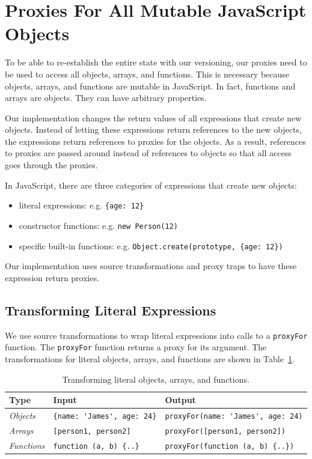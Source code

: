\section{Proxies For All Mutable JavaScript Objects}

To be able to re-establish the entire state with our versioning, our proxies need to be used to access all objects, arrays, and functions.
This is necessary because objects, arrays, and functions are mutable in JavaScript.
In fact, functions and arrays are objects.
They can have arbitrary properties.

Our implementation changes the return values of all expressions that create new objects.
Instead of letting these expressions return references to the new objects, the expressions return references to proxies for the objects.
As a result, references to proxies are passed around instead of references to objects so that all access goes through the proxies.

In JavaScript, there are three categories of expressions that create new objects: 
\begin{itemize}
    \item literal expressions: e.g. \lstinline|{age: 12}|
    \item constructor functions: e.g. \lstinline|new Person(12)|
    \item specific built-in functions: e.g. \lstinline|Object.create(prototype, {age: 12})|
\end{itemize}

Our implementation uses source transformations and proxy traps to have these expression return proxies.


\subsection{Transforming Literal Expressions}

We use source transformations to wrap literal expressions into calls to a \lstinline{proxyFor} function.
The \lstinline{proxyFor} function returns a proxy for its argument.
The transformations for literal objects, arrays, and functions are shown in Table~\ref{table:literalTransforms}.

\begin{table}[h]
\begin{center}
\begin{tabular}{| l | l | l |}
\hline
Type & Input & Output \\ \hline
\emph{Objects} & \lstinline|{name: 'James', age: 24}| & \lstinline|proxyFor(name: 'James', age: 24)| \\ \hline
\emph{Arrays} & \lstinline|[person1, person2]| & \lstinline|proxyFor([person1, person2])| \\ \hline
\emph{Functions} & \lstinline|function (a, b) {..}| & \lstinline|proxyFor(function (a, b) {..})| \\ \hline
\end{tabular}
\end{center}
\caption[Table caption text]{Transforming literal objects, arrays, and functions.}
\label{table:literalTransforms}
\end{table}

